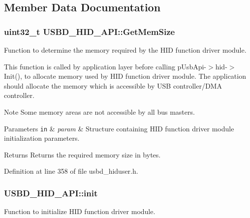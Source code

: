 \subsection{Member Data Documentation}
\subsubsection[{\texorpdfstring{Get\+Mem\+Size}{GetMemSize}}]{\setlength{\rightskip}{0pt plus 5cm}uint32\+\_\+t U\+S\+B\+D\+\_\+\+H\+I\+D\+\_\+\+A\+P\+I\+::\+Get\+Mem\+Size}\hypertarget{structUSBD__HID__API_a020839a4e29677899bb7a0a2c11b1252}{}\label{structUSBD__HID__API_a020839a4e29677899bb7a0a2c11b1252}
Function to determine the memory required by the H\+ID function driver module.

This function is called by application layer before calling p\+Usb\+Api-\/$>$hid-\/$>$Init(), to allocate memory used by H\+ID function driver module. The application should allocate the memory which is accessible by U\+SB controller/\+D\+MA controller. \begin{DoxyNote}{Note}
Some memory areas are not accessible by all bus masters.
\end{DoxyNote}

\begin{DoxyParams}[1]{Parameters}
\mbox{\tt in}  & {\em param} & Structure containing H\+ID function driver module initialization parameters. \\
\hline
\end{DoxyParams}
\begin{DoxyReturn}{Returns}
Returns the required memory size in bytes. 
\end{DoxyReturn}


Definition at line 358 of file usbd\+\_\+hiduser.\+h.

\subsubsection[{\texorpdfstring{init}{init}}]{ U\+S\+B\+D\+\_\+\+H\+I\+D\+\_\+\+A\+P\+I\+::init}\hypertarget{structUSBD__HID__API_a7b98c434713f1deb07abafcb52fae76d}{}\label{structUSBD__HID__API_a7b98c434713f1deb07abafcb52fae76d}
Function to initialize H\+ID function driver module.

